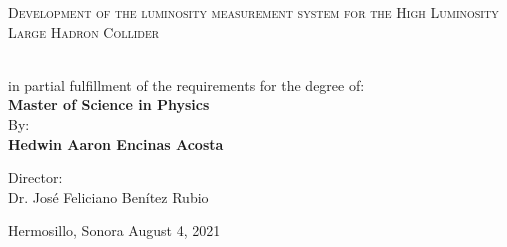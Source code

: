 %
%
%
%
%
%
%
%
%
%
%

%
%
%
%
%
%
%
%
%
%
%
%
%
%
%
\begin{minipage}[l][0.78\textheight][t]{0.1\textwidth}
    \begin{center}
    \hskip0pt
    \vrule width2.5pt height17cm    %
        \hskip1mm
        \vrule width1pt height17cm  %
        \end{center}
\end{minipage}
\begin{minipage}[c][0.78\textheight][t]{0.8\textwidth}
      \begin{center}
      \vspace{2cm}
        {\Large \scshape {Development of the luminosity measurement system for
the High Luminosity Large Hadron Collider}}

        \vspace{3cm}

          \\[20pt]
         in partial fulfillment of the
requirements for the degree of:\\[5pt]
        {\Large \textbf{{Master of Science in Physics}}}\\[40pt]
        By:\\[12pt]
        \textbf{  {\large Hedwin Aaron Encinas Acosta}}

        \vspace{2cm}

        { \large Director}:\\Dr. José Feliciano Benítez Rubio

        \vspace{2.5cm}

        { Hermosillo, Sonora} \hskip2.5cm {August 4, 2021}
      \end{center}
\end{minipage}
